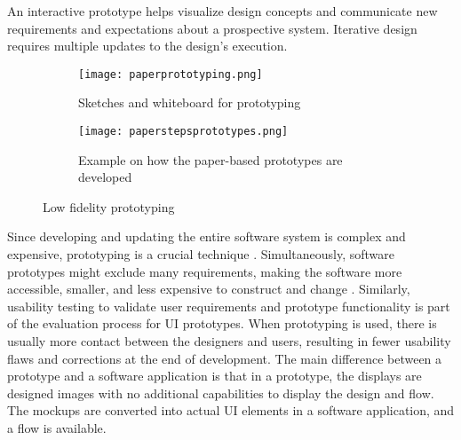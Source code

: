 An interactive prototype helps visualize design concepts and communicate new requirements and expectations about a prospective system.
Iterative design requires multiple updates to the design's execution.
\begin{figure}[htbp!]
  \begin{subfigure}[b]{0.5\textwidth}
    \centering
    \texttt{[image: paperprototyping.png]}
    \caption{Sketches and whiteboard for prototyping}
    \label{fig:background:paperPrototyping}   
  \end{subfigure}             
  \begin{subfigure}[b]{0.5\textwidth}
    \centering
    \texttt{[image: paperstepsprototypes.png]}
    \caption[Paper based prototypes]{Example on how the paper-based prototypes are developed  \cite{misc:prototyping:uxpin}}
    \label{fig:background:paperprototypes}
  \end{subfigure}             
  \caption[Low fidelity prototyping]{Low fidelity prototyping}
  \label{fig:background:main}
\end{figure}
Since developing and updating the entire software system is complex and expensive, prototyping is a crucial technique \cite{article:prototyping:szekely}.
Simultaneously, software prototypes might exclude many requirements, making the software more accessible, smaller, and less expensive to construct and change \cite{article:prototyping:szekely}. 
Similarly, usability testing to validate user requirements and prototype functionality is part of the evaluation process for UI prototypes.
When prototyping is used, there is usually more contact between the designers and users, resulting in fewer usability flaws and corrections at the end of development.
The main difference between a prototype and a software application is that in a prototype, the displays are designed images with no additional capabilities to display the design and flow. The mockups are converted into actual UI elements in a software application, and a flow is available.

